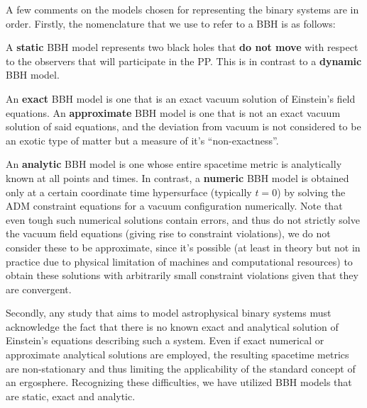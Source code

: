 A few comments on the models chosen for representing the binary systems are in order. Firstly, the nomenclature that we use to refer to a BBH is as follows:

\begin{definition}
    A \textbf{static} BBH model represents two black holes that \textbf{do not move} with respect to the observers that will participate in the PP. This is in contrast to a \textbf{dynamic} BBH model.
\end{definition}

\begin{definition}
    An \textbf{exact} BBH model is one that is an exact vacuum solution of Einstein's field equations. An \textbf{approximate} BBH model is one that is not an exact vacuum solution of said equations, and the deviation from vacuum is not considered to be an exotic type of matter but a measure of it's ``non-exactness''.
\end{definition}

\begin{definition}
    An \textbf{analytic} BBH model is one whose entire spacetime metric is analytically known at all points and times. In contrast, a \textbf{numeric} BBH model is obtained only at a certain coordinate time hypersurface (typically $t=0$) by solving the ADM constraint equations for a vacuum configuration numerically. Note that even tough such numerical solutions contain errors, and thus do not strictly solve the vacuum field equations (giving rise to constraint violations), we do not consider these to be approximate, since it's possible (at least in theory but not in practice due to physical limitation of machines and computational resources) to obtain these solutions with arbitrarily small constraint violations given that they are convergent.
\end{definition}

Secondly, any study that aims to model astrophysical binary systems must acknowledge the fact that there is no known exact and analytical solution of Einstein's equations describing such a system. Even if exact numerical or approximate analytical solutions are employed, the resulting spacetime metrics are non-stationary and thus limiting the applicability of the standard concept of an ergosphere. Recognizing these difficulties, we have utilized BBH models that are static, exact and analytic.

